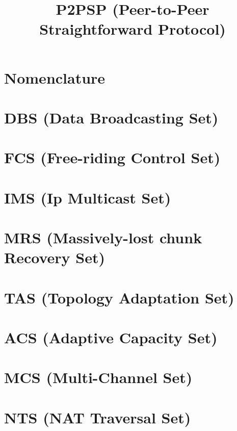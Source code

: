 \newcommand{\note}[1]{\color{red}\textbf{#1}}

\title{P2PSP (Peer-to-Peer Straightforward Protocol)}
\maketitle
\tableofcontents

\begin{abstract}

\end{abstract}

\section*{Nomenclature}


\section{DBS (Data Broadcasting Set)}
\label{sec:DBS}


\section{FCS (Free-riding Control Set)}
\label{sec:FCS}


\section{IMS (Ip Multicast Set)}
\label{sec:IMS}


\section{MRS (Massively-lost chunk Recovery Set)}
\label{sec:MRS}


\section{TAS (Topology Adaptation Set)}
\label{sec:TAS}


\section{ACS (Adaptive Capacity Set)}
\label{sec:ACS}


\section{MCS (Multi-Channel Set)}
\label{sec:MCS}


\section{NTS (NAT Traversal Set)}
\label{sec:NTS}



